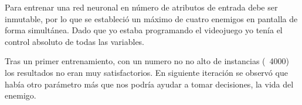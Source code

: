 Para entrenar una red neuronal en número de atributos de entrada debe ser inmutable, por lo que se estableció un máximo de cuatro enemigos en pantalla de forma simultánea. Dado que yo estaba programando el videojuego yo tenía el control absoluto de todas las variables.


Tras un primer entrenamiento, con un numero no no alto de instancias (~4000) los resultados no eran muy satisfactorios. En siguiente iteración se observó que había otro parámetro más que nos podría ayudar a tomar decisiones, la vida del enemigo.



